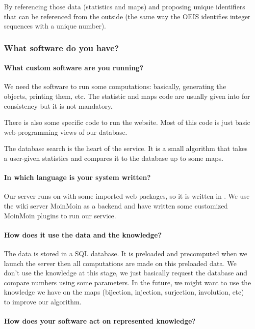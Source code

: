 By referencing those data (statistics and maps) and proposing unique identifiers that can be referenced from the outside (the same way the OEIS identifies integer sequences with a unique number).

\subsubsection{What software do you have?}
 \paragraph{What custom software are you running?}

We need the software \SageMath to run some computations: basically, generating the objects, printing them, etc. The statistic and maps code are usually given into \SageMath for consistency but it is not mandatory.

There is also some \FindStat specific code to run the website. Most of this code is just basic web-programming views of our database.

The database search is the heart of the service. It is a small algorithm that takes a user-given statistics and compares it to the database up to some maps.

\paragraph{In which language is your system written?}

Our server runs on \SageMath with some imported web packages, so it is written in \python. We use the \python wiki server \textsf{MoinMoin} as a backend and have written some customized \textsf{MoinMoin} plugins to run our service.

 \paragraph{How does it use the data and the knowledge?}

The data is stored in a SQL database. It is preloaded and precomputed when we launch the server then all computations are made on this preloaded data. We don't use the knowledge at this stage, we just basically request the database and compare numbers using some parameters. In the future, we might want to  use the knowledge we have on the maps (bijection, injection, surjection, involution, etc) to improve our algorithm.

\paragraph{How does your software act on represented knowledge?}

